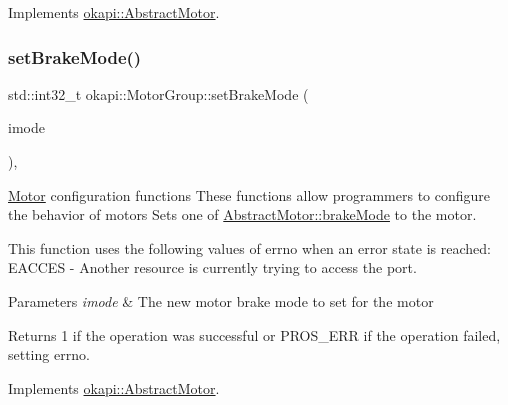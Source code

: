 Implements \mbox{\hyperlink{classokapi_1_1AbstractMotor_a15d12555f527109b046c65fe753d7e20}{okapi\+::\+Abstract\+Motor}}.

\mbox{\label{classokapi_1_1MotorGroup_a2124ee76893c401cd6dbf4879808349a}} 
\subsubsection{\texorpdfstring{setBrakeMode()}{setBrakeMode()}}
{\footnotesize\ttfamily std\+::int32\+\_\+t okapi\+::\+Motor\+Group\+::set\+Brake\+Mode (\begin{DoxyParamCaption}\item[{\mbox{\hyperlink{classokapi_1_1AbstractMotor_a132e0485dbb59a60c3f934338d8fa601}{Abstract\+Motor\+::brake\+Mode}}}]{imode }\end{DoxyParamCaption})\hspace{0.3cm}{\ttfamily [override]}, {\ttfamily [virtual]}}

\mbox{\hyperlink{classokapi_1_1Motor}{Motor}} configuration functions These functions allow programmers to configure the behavior of motors Sets one of \mbox{\hyperlink{classokapi_1_1AbstractMotor_a132e0485dbb59a60c3f934338d8fa601}{Abstract\+Motor\+::brake\+Mode}} to the motor.

This function uses the following values of errno when an error state is reached\+: E\+A\+C\+C\+ES -\/ Another resource is currently trying to access the port.


\begin{DoxyParams}{Parameters}
{\em imode} & The new motor brake mode to set for the motor \\
\hline
\end{DoxyParams}
\begin{DoxyReturn}{Returns}
1 if the operation was successful or P\+R\+O\+S\+\_\+\+E\+RR if the operation failed, setting errno. 
\end{DoxyReturn}


Implements \mbox{\hyperlink{classokapi_1_1AbstractMotor_af7bb7d0d895c89d6b193f500587a818b}{okapi\+::\+Abstract\+Motor}}.

\mbox{\label{classokapi_1_1MotorGroup_a6d70691246bb8ba18d17f97b40a7f3f9}} 
